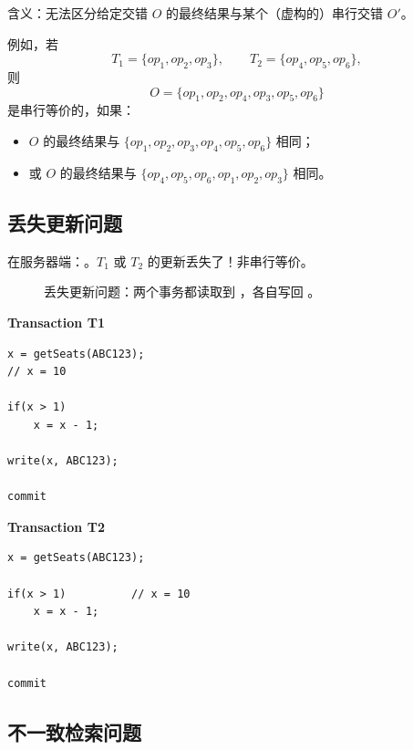含义：无法区分给定交错 $O$ 的最终结果与某个（虚构的）串行交错 $O'$。

例如，若
\[
T_1=\{\mathit{op}_1,\mathit{op}_2,\mathit{op}_3\}, \qquad
T_2=\{\mathit{op}_4,\mathit{op}_5,\mathit{op}_6\},
\]
则
\[
O=\{\mathit{op}_1,\mathit{op}_2,\mathit{op}_4,\mathit{op}_3,\mathit{op}_5,\mathit{op}_6\}
\]
是串行等价的，如果：

\begin{itemize}
  \item $O$ 的最终结果与
  $\{\mathit{op}_1,\mathit{op}_2,\mathit{op}_3,\mathit{op}_4,\mathit{op}_5,\mathit{op}_6\}$ 相同；
  \item 或 $O$ 的最终结果与
  $\{\mathit{op}_4,\mathit{op}_5,\mathit{op}_6,\mathit{op}_1,\mathit{op}_2,\mathit{op}_3\}$ 相同。
\end{itemize}

\subsection{丢失更新问题}

在服务器端：。$T_1$ 或 $T_2$ 的更新丢失了！非串行等价。

\begin{figure}[H]
  \centering
  \caption{丢失更新问题：两个事务都读取到 ，各自写回 。}
\end{figure}

\begin{minipage}[t]{0.47\textwidth}
\textbf{Transaction T1}
\begin{verbatim}
x = getSeats(ABC123);
// x = 10

if(x > 1)
    x = x - 1;

write(x, ABC123);

commit
\end{verbatim}
\end{minipage}\hfill
\begin{minipage}[t]{0.47\textwidth}
\textbf{Transaction T2}
\begin{verbatim}
x = getSeats(ABC123);

if(x > 1)          // x = 10
    x = x - 1;

write(x, ABC123);

commit
\end{verbatim}
\end{minipage}

\subsection{不一致检索问题}

